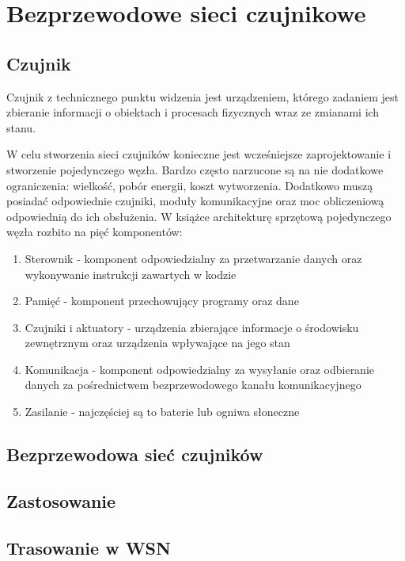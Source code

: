 \chapter{Bezprzewodowe sieci czujnikowe}
\section{Czujnik}
Czujnik z technicznego punktu widzenia jest urządzeniem, którego zadaniem jest zbieranie informacji o obiektach i procesach fizycznych wraz ze zmianami ich stanu.\cite{Dargie2010}

W celu stworzenia sieci czujników konieczne jest wcześniejsze zaprojektowanie i stworzenie pojedynczego węzła. Bardzo często narzucone są na nie dodatkowe ograniczenia: wielkość, pobór energii, koszt wytworzenia. Dodatkowo muszą posiadać odpowiednie czujniki, moduły komunikacyjne oraz moc obliczeniową odpowiednią do ich obsłużenia. W książce \cite{Karl2006} architekturę sprzętową pojedynczego węzła rozbito na pięć komponentów:
\begin{enumerate}
	\item Sterownik - komponent odpowiedzialny za przetwarzanie danych oraz wykonywanie instrukcji zawartych w kodzie
	\item Pamięć - komponent przechowujący programy oraz dane
	\item Czujniki i aktuatory - urządzenia zbierające informacje o środowisku zewnętrznym oraz urządzenia wpływające na jego stan
	\item Komunikacja - komponent odpowiedzialny za wysyłanie oraz odbieranie danych za pośrednictwem bezprzewodowego kanału komunikacyjnego
	\item Zasilanie - najczęściej są to baterie lub ogniwa słoneczne
\end{enumerate}
\section{Bezprzewodowa sieć czujników}
\section{Zastosowanie}
\section{Trasowanie w WSN}
